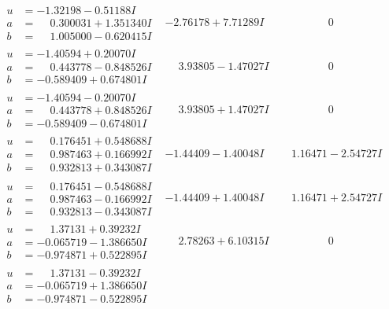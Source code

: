 \documentclass[1p]{elsarticle_modified}
\theoremstyle{definition}
\begin{document}
$$\begin{array}{c|c|c}
\begin{aligned}
u &= -1.32198 - 0.51188 I \\
a &= \phantom{-}0.300031 + 1.351340 I \\
b &= \phantom{-}1.005000 - 0.620415 I\end{aligned}
 & -2.76178 + 7.71289 I & \phantom{-0.000000 } 0 \\ \hline\begin{aligned}
u &= -1.40594 + 0.20070 I \\
a &= \phantom{-}0.443778 - 0.848526 I \\
b &= -0.589409 + 0.674801 I\end{aligned}
 & \phantom{-}3.93805 - 1.47027 I & \phantom{-0.000000 } 0 \\ \hline\begin{aligned}
u &= -1.40594 - 0.20070 I \\
a &= \phantom{-}0.443778 + 0.848526 I \\
b &= -0.589409 - 0.674801 I\end{aligned}
 & \phantom{-}3.93805 + 1.47027 I & \phantom{-0.000000 } 0 \\ \hline\begin{aligned}
u &= \phantom{-}0.176451 + 0.548688 I \\
a &= \phantom{-}0.987463 + 0.166992 I \\
b &= \phantom{-}0.932813 + 0.343087 I\end{aligned}
 & -1.44409 - 1.40048 I & \phantom{-}1.16471 - 2.54727 I \\ \hline\begin{aligned}
u &= \phantom{-}0.176451 - 0.548688 I \\
a &= \phantom{-}0.987463 - 0.166992 I \\
b &= \phantom{-}0.932813 - 0.343087 I\end{aligned}
 & -1.44409 + 1.40048 I & \phantom{-}1.16471 + 2.54727 I \\ \hline\begin{aligned}
u &= \phantom{-}1.37131 + 0.39232 I \\
a &= -0.065719 - 1.386650 I \\
b &= -0.974871 + 0.522895 I\end{aligned}
 & \phantom{-}2.78263 + 6.10315 I & \phantom{-0.000000 } 0 \\ \hline\begin{aligned}
u &= \phantom{-}1.37131 - 0.39232 I \\
a &= -0.065719 + 1.386650 I \\
b &= -0.974871 - 0.522895 I\end{aligned}

\end{array}$$
\end{document}
